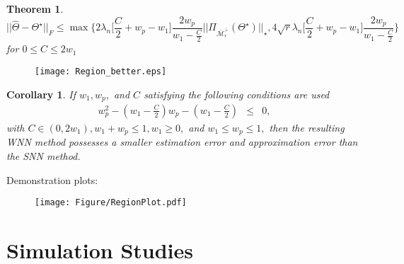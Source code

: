 \documentclass[12pt]{article}
\newtheorem{theorem}{Theorem}[section]
\newtheorem{corollary}{Corollary}[theorem]
\begin{document}
\begin{theorem} \label{thm2}
\begin{equation}
    || \widehat{\Theta} - \Theta^{\star} ||_{F} \leq \max \bigg\{2\lambda_{n}\bigg[\frac{C}{2} + w_{p}-w_{1}\bigg]\frac{2w_{p}}{w_{1}-\frac{C}{2}}||\Pi_{\overline{\mathcal{M}}_{r}^{\perp}}(\Theta^{\star})||_{\star}, 4\sqrt{r}\lambda_{n}\bigg[\frac{C}{2} + w_{p}-w_{1}\bigg]\frac{2w_{p}}{w_{1}-\frac{C}{2}}\bigg\} \nonumber
\end{equation}
for $0 \leq C \leq 2w_{1}$
\end{theorem}

\begin{figure}
  \texttt{[image: Region\_better.eps]}
  \caption{} 
  \label{fig_rate_zsc}
\end{figure}

\newpage
\begin{corollary}
If $w_{1}, w_{p},$ and $C$ satisfying the following conditions are used
\begin{eqnarray}
w^2_{p} - (w_{1}-\frac{C}{2})w_{p} - (w_{1} - \frac{C}{2}) & \leq & 0, \nonumber
\end{eqnarray}
with $C \in (0, 2w_{1}), w_{1} + w_{p} \leq 1, w_{1} \geq 0,$ and $w_{1} \leq w_{p} \leq 1,$ 
then the resulting WNN method possesses a smaller estimation error and approximation error than the SNN method.
\end{corollary}
Demonstration plots:


\begin{figure}[htbp]
\centering
  \texttt{[image: Figure/RegionPlot.pdf]}
  \caption{} 
  \label{fig_1}
\end{figure}

\section{Simulation Studies}
\end{document}
